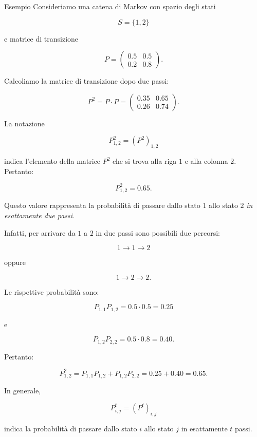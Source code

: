 \begin{example}{Esempio}
Consideriamo una catena di Markov con spazio degli stati

$$
S=\{1,2\}
$$

e matrice di transizione

$$
P=
\begin{pmatrix}
0.5 & 0.5\\
0.2 & 0.8
\end{pmatrix}.
$$

Calcoliamo la matrice di transizione dopo due passi:

$$
P^2=P\cdot P
=
\begin{pmatrix}
0.35 & 0.65\\
0.26 & 0.74
\end{pmatrix}.
$$

La notazione

$$
P^2_{1,2}=(P^2)_{1,2}
$$

indica l'elemento della matrice $P^2$ che si trova alla riga $1$ e alla colonna $2$. Pertanto:

$$
P^2_{1,2}=0.65.
$$

Questo valore rappresenta la probabilità di passare dallo stato $1$ allo stato $2$ \emph{in esattamente due passi}.

Infatti, per arrivare da $1$ a $2$ in due passi sono possibili due percorsi:

$$
1\rightarrow1\rightarrow2
$$

oppure

$$
1\rightarrow2\rightarrow2.
$$

Le rispettive probabilità sono:

$$
P_{1,1}P_{1,2}=0.5\cdot0.5=0.25
$$

e

$$
P_{1,2}P_{2,2}=0.5\cdot0.8=0.40.
$$

Pertanto:

$$
P^2_{1,2}
=
P_{1,1}P_{1,2}
+
P_{1,2}P_{2,2}
=
0.25+0.40
=
0.65.
$$

In generale,

$$
\boxed{P^t_{i,j}=(P^t)_{i,j}}
$$

indica la probabilità di passare dallo stato $i$ allo stato $j$ in esattamente $t$ passi.
\end{example}


